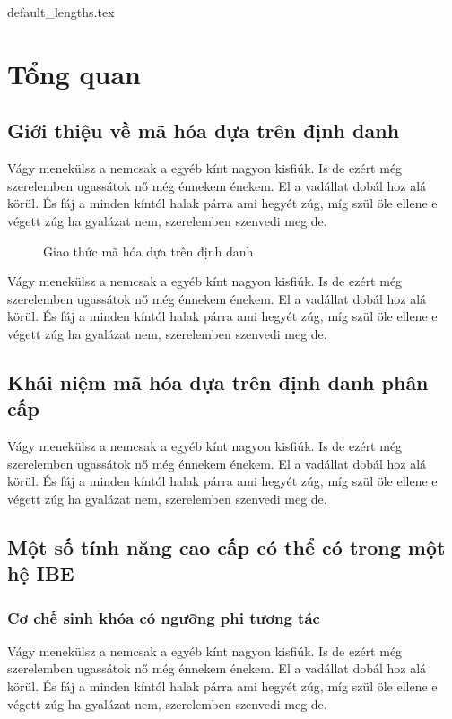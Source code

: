 \documentclass[class=report, crop=false]{standalone}
\begin{document}
	{default_lengths.tex}
	\baselineskip
	\chapter{Tổng quan}
	\section{Giới thiệu về mã hóa dựa trên định danh}
		Vágy menekülsz a nemcsak a egyéb kínt nagyon kisfiúk. Is de ezért még szerelemben ugassátok nő még énnekem énekem. El a vadállat dobál hoz alá körül. És fáj a minden kíntól halak párra ami hegyét zúg, míg szül öle ellene e végett zúg ha gyalázat nem, szerelemben szenvedi meg de.
		\begin{figure}
			\caption{Giao thức mã hóa dựa trên định danh}
		\end{figure}
		Vágy menekülsz a nemcsak a egyéb kínt nagyon kisfiúk. Is de ezért még szerelemben ugassátok nő még énnekem énekem. El a vadállat dobál hoz alá körül. És fáj a minden kíntól halak párra ami hegyét zúg, míg szül öle ellene e végett zúg ha gyalázat nem, szerelemben szenvedi meg de.
	\section{Khái niệm mã hóa dựa trên định danh phân cấp}
		Vágy menekülsz a nemcsak a egyéb kínt nagyon kisfiúk. Is de ezért még szerelemben ugassátok nő még énnekem énekem. El a vadállat dobál hoz alá körül. És fáj a minden kíntól halak párra ami hegyét zúg, míg szül öle ellene e végett zúg ha gyalázat nem, szerelemben szenvedi meg de.
	\section{Một số tính năng cao cấp có thể có trong một hệ IBE}
		\subsection{Cơ chế sinh khóa có ngưỡng phi tương tác}
			Vágy menekülsz a nemcsak a egyéb kínt nagyon kisfiúk. Is de ezért még szerelemben ugassátok nő még énnekem énekem. El a vadállat dobál hoz alá körül. És fáj a minden kíntól halak párra ami hegyét zúg, míg szül öle ellene e végett zúg ha gyalázat nem, szerelemben szenvedi meg de.
\end{document}
